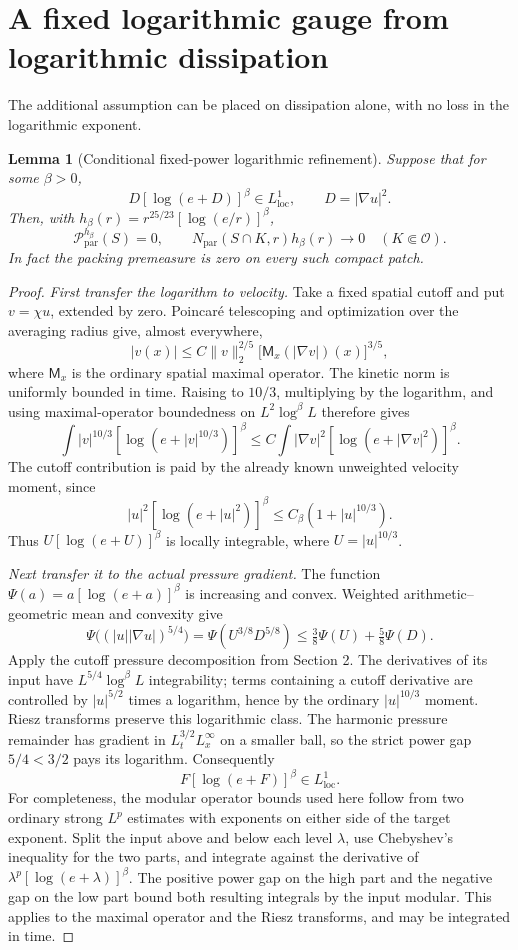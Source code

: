\documentclass[11pt]{article}
\newtheorem{lemma}{Lemma}
\begin{document}
\section{A fixed logarithmic gauge from logarithmic dissipation}
The additional assumption can be placed on dissipation alone, with no loss in the logarithmic exponent.
\begin{lemma}[Conditional fixed-power logarithmic refinement]
Suppose that for some $\beta>0$,
$$
D[\log(e+D)]^\beta\in L^1_{\mathrm{loc}},\qquad D=|\nabla u|^2.
$$
Then, with $h_\beta(r)=r^{25/23}[\log(e/r)]^\beta$,
$$
\mathcal P^{h_\beta}_{\mathrm{par}}(S)=0,
\qquad
N_{\mathrm{par}}(S\cap K,r)h_\beta(r)\longrightarrow0
\quad(K\Subset\mathcal O).
$$
In fact the packing premeasure is zero on every such compact patch.
\end{lemma}
\begin{proof}
\emph{First transfer the logarithm to velocity.}
Take a fixed spatial cutoff and put $v=\chi u$, extended by zero. Poincar\'e telescoping and optimization over the averaging radius give, almost everywhere,
$$
|v(x)|\le C\|v\|_2^{2/5}
\bigl[\mathsf M_x(|\nabla v|)(x)\bigr]^{3/5},
$$
where $\mathsf M_x$ is the ordinary spatial maximal operator. The kinetic norm is uniformly bounded in time. Raising to $10/3$, multiplying by the logarithm, and using maximal-operator boundedness on $L^2\log^\beta L$ therefore gives
$$
\int |v|^{10/3}[\log(e+|v|^{10/3})]^\beta
\le C\int |\nabla v|^2[\log(e+|\nabla v|^2)]^\beta.
$$
The cutoff contribution is paid by the already known unweighted velocity moment, since
$$
|u|^2[\log(e+|u|^2)]^\beta
\le C_\beta(1+|u|^{10/3}).
$$
Thus $U[\log(e+U)]^\beta$ is locally integrable, where $U=|u|^{10/3}$.

\emph{Next transfer it to the actual pressure gradient.}
The function $\Psi(a)=a[\log(e+a)]^\beta$ is increasing and convex. Weighted arithmetic--geometric mean and convexity give
$$
\Psi\bigl((|u||\nabla u|)^{5/4}\bigr)
=\Psi(U^{3/8}D^{5/8})
\le\tfrac38\Psi(U)+\tfrac58\Psi(D).
$$
Apply the cutoff pressure decomposition from Section 2. The derivatives of its input have $L^{5/4}\log^\beta L$ integrability; terms containing a cutoff derivative are controlled by $|u|^{5/2}$ times a logarithm, hence by the ordinary $|u|^{10/3}$ moment. Riesz transforms preserve this logarithmic class. The harmonic pressure remainder has gradient in $L^{3/2}_tL^\infty_x$ on a smaller ball, so the strict power gap $5/4<3/2$ pays its logarithm. Consequently
$$
F[\log(e+F)]^\beta\in L^1_{\mathrm{loc}}.
$$
For completeness, the modular operator bounds used here follow from two ordinary strong $L^p$ estimates with exponents on either side of the target exponent. Split the input above and below each level $\lambda$, use Chebyshev's inequality for the two parts, and integrate against the derivative of $\lambda^p[\log(e+\lambda)]^\beta$. The positive power gap on the high part and the negative gap on the low part bound both resulting integrals by the input modular. This applies to the maximal operator and the Riesz transforms, and may be integrated in time.


\end{proof}
\end{document}
